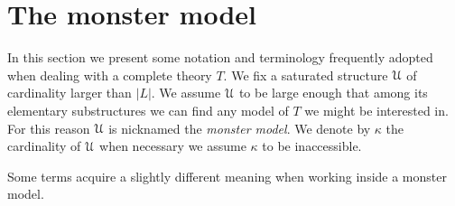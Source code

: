 \documentclass[creche.tex]{subfiles}
\begin{document}
\section{The monster model}\label{monster}

\label{compattezzasaturazione}


In this section we present some notation and terminology frequently adopted when dealing with a complete theory $T$. We fix a saturated structure $\EuScript U$ of cardinality larger than $|L|$. We assume $\EuScript U$ to be large enough that among its elementary substructures we can find any model of $T$ we might be interested in. For this reason $\EuScript U$ is nicknamed the \emph{monster model}. We denote by $\kappa$ the cardinality of $\EuScript U$ when necessary we assume $\kappa$ to be inaccessible. 

Some terms acquire a slightly different meaning when working inside a monster model.


\newcommand{\labellalunga}[1]{#1\hfill}
\newenvironment{litemize}[1]
   {\begin{list}{}{
   \setlength{\parskip}{0mm}
   \setlength{\topsep}{5mm}
   \setlength{\partopsep}{0mm}
   \setlength{\rightmargin}{0mm}
   \setlength{\listparindent}{0mm}
   \setlength{\itemindent}{0mm}
   \setlength{\itemsep}{3mm}
   \settowidth{\labelwidth}{#1}
   \setlength{\parsep}{0mm}
   \setlength{\partopsep}{0mm}
   \setlength{\labelsep}{3mm}
   \setlength{\leftmargin}{\labelwidth+\labelsep}
   \let\makelabel\labellalunga}}{
   \end{list}}
\end{document}
